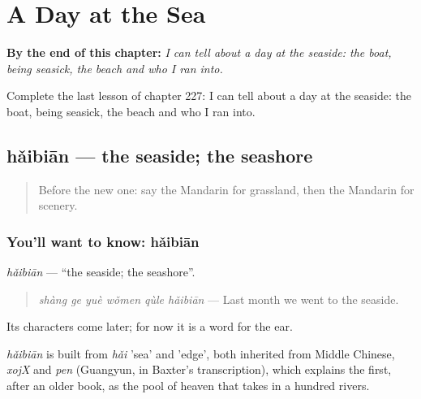 
\chapter{A Day at the Sea}
\label{ch:zh-a-day-at-the-sea}

\begin{chapteropening}
\textbf{By the end of this chapter:} \emph{I can tell about a day at the seaside: the boat, being seasick, the beach and who I ran into.}

Complete the last lesson of chapter 227: I can tell about a day at the seaside: the boat, being seasick, the beach and who I ran into.
\end{chapteropening}

\section[hǎibiān]{hǎibiān — the seaside; the seashore}

\label{lesson:ZH-C227-haibian}



\begin{quote}
Before the new one: say the Mandarin for grassland, then the Mandarin for scenery.
\end{quote}

\subsection*{You'll want to know: hǎibiān}
\emph{hǎibiān} — \textquotedblleft{}the seaside; the seashore\textquotedblright{}.

\begin{quote}
\emph{shàng ge yuè wǒmen qùle hǎibiān} — Last month we went to the seaside.
\end{quote}

Its characters come later; for now it is a word for the ear.

\begin{cousinweb}
\emph{hǎibiān} is built from \emph{hǎi} 'sea' and  'edge', both inherited from Middle Chinese, \emph{xojX} and \emph{pen} (Guangyun, in Baxter's transcription), which explains the first, after an older book, as the pool of heaven that takes in a hundred rivers.
\end{cousinweb}

